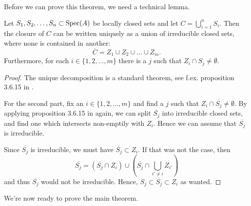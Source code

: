 Before we can prove this theorem, we need a technical lemma.

\begin{lemma}\label{lem:irred_has_opens}
  Let $S_{1}, S_{2}, \dots, S_{n} \subset \operatorname{Spec}(A)$ be locally closed sets and let $C = \bigcup_{i=1}^{n} S_{i}$. Then the closure of $C$ can be written uniquely as a union of irreducible closed sets, where none is contained in another:
  \[\overline C = Z_{1} \cup Z_{2} \cup \dots \cup Z_{m}.\]
  Furthermore, for each $i \in \{1, 2, \dots, m\}$ there is a $j$ such that $Z_{i} \cap S_{j} \neq \emptyset$.
\end{lemma}
\begin{proof}
  The unique decomposition is a standard theorem, see f.ex. proposition 3.6.15 in \cite{FOAG}.

  For the second part, fix an $i \in \{1, 2, \dots, m\}$ and find a $j$ such that $Z_{i} \cap \overline{S_{j}} \neq \emptyset$. By applying proposition 3.6.15 in \cite{FOAG} again, we can split $\overline{S_{j}}$ into irreducible closed sets, and find one which intersects non-emptily with $Z_{i}$. Hence we can assume that $\overline{S_{j}}$ is irreducible.

  Since $\overline{S_{j}}$ is irreducible, we must have $\overline{S_{j}} \subset Z_{i}$. If that was not the case, then \[\overline{S_{j}} = (\overline{S_{j}} \cap Z_{i}) \cup (\overline{S_{j}} \cap \bigcup_{i' \neq i} Z_{i'})\] and thus $\overline{S_{j}}$ would not be irreducible. Hence, $S_{j} \subset \overline{S_{j}} \subset Z_{i}$ as wanted.
\end{proof}

We're now ready to prove the main theorem.

